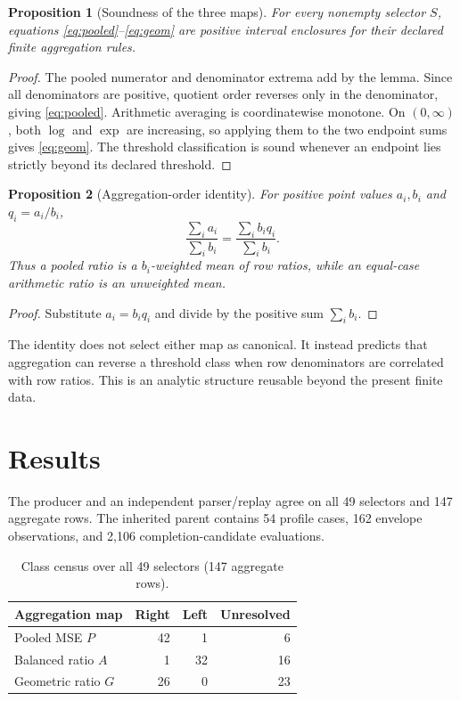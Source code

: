 \documentclass[10pt,a4paper]{article}
\newtheorem{proposition}{Proposition}
\begin{document}
\begin{proposition}[Soundness of the three maps]
For every nonempty selector $S$, equations \eqref{eq:pooled}--\eqref{eq:geom}
are positive interval enclosures for their declared finite aggregation rules.
\end{proposition}
\begin{proof}
The pooled numerator and denominator extrema add by the lemma.  Since all
denominators are positive, quotient order reverses only in the denominator,
giving \eqref{eq:pooled}.  Arithmetic averaging is coordinatewise monotone.
On $(0,\infty)$, both $\log$ and $\exp$ are increasing, so applying them to
the two endpoint sums gives \eqref{eq:geom}.  The threshold classification is
sound whenever an endpoint lies strictly beyond its declared threshold.
\end{proof}

\begin{proposition}[Aggregation-order identity]
For positive point values $a_i,b_i$ and $q_i=a_i/b_i$,
\[
 \frac{\sum_i a_i}{\sum_i b_i}
 =\frac{\sum_i b_iq_i}{\sum_i b_i}.
 \label{eq:weighted}
\]
Thus a pooled ratio is a $b_i$-weighted mean of row ratios, while an
equal-case arithmetic ratio is an unweighted mean.
\end{proposition}
\begin{proof}
Substitute $a_i=b_iq_i$ and divide by the positive sum $\sum_i b_i$.
\end{proof}

The identity does not select either map as canonical.  It instead predicts that
aggregation can reverse a threshold class when row denominators are correlated
with row ratios.  This is an analytic structure reusable beyond the present
finite data.

\section{Results}

The producer and an independent parser/replay agree on all 49 selectors and
147 aggregate rows.  The inherited parent contains 54 profile cases, 162
envelope observations, and 2,106 completion-candidate evaluations.

\begin{table}[t]
\centering\small
\caption{Class census over all 49 selectors (147 aggregate rows).}
\label{tab:census}
\begin{tabular}{lrrr}
\toprule
Aggregation map & Right & Left & Unresolved\\
\midrule
Pooled MSE $P$ & 42 & 1 & 6\\
Balanced ratio $A$ & 1 & 32 & 16\\
Geometric ratio $G$ & 26 & 0 & 23\\
\bottomrule
\end{tabular}
\end{table}
\end{document}
